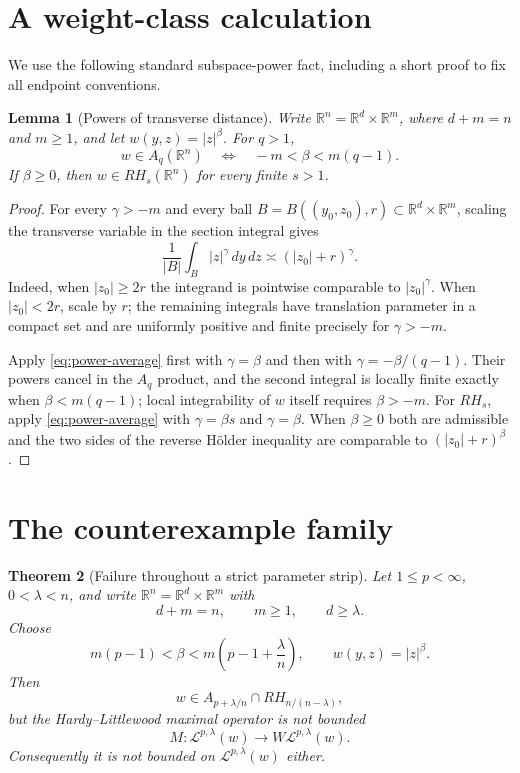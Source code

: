 \documentclass[10pt]{article}
\newtheorem{theorem}{Theorem}
\newtheorem{lemma}[theorem]{Lemma}
\newcommand{\R}{\mathbb R}
\newcommand{\Mor}{\mathcal L}
\newcommand{\WMor}{W\mathcal L}
\begin{document}
\section*{A weight-class calculation}

We use the following standard subspace-power fact, including a short proof to
fix all endpoint conventions.

\begin{lemma}[Powers of transverse distance]\label{lem:weight}
Write $\R^n=\R^d\times\R^m$, where $d+m=n$ and $m\ge1$, and let
\(w(y,z)=|z|^\beta\).  For $q>1$,
\[
 w\in A_q(\R^n)\quad\Longleftrightarrow\quad
 -m<\beta<m(q-1).
\]
If $\beta\ge0$, then $w\in RH_s(\R^n)$ for every finite $s>1$.
\end{lemma}

\begin{proof}
For every $\gamma>-m$ and every ball
$B=B((y_0,z_0),r)\subset\R^d\times\R^m$, scaling the transverse variable
in the section integral gives
\begin{equation}\label{eq:power-average}
 \frac1{|B|}\int_B |z|^\gamma\,dy\,dz
 \asymp (|z_0|+r)^\gamma.
\end{equation}
Indeed, when $|z_0|\ge2r$ the integrand is pointwise comparable to
$|z_0|^\gamma$.  When $|z_0|<2r$, scale by $r$; the remaining integrals have
translation parameter in a compact set and are uniformly positive and
finite precisely for $\gamma>-m$.

Apply \eqref{eq:power-average} first with $\gamma=\beta$ and then with
$\gamma=-\beta/(q-1)$.  Their powers cancel in the $A_q$ product, and the
second integral is locally finite exactly when $\beta<m(q-1)$; local
integrability of $w$ itself requires $\beta>-m$.  For $RH_s$, apply
\eqref{eq:power-average} with $\gamma=\beta s$ and $\gamma=\beta$.
When $\beta\ge0$ both are admissible and the two sides of the reverse
Hölder inequality are comparable to $(|z_0|+r)^\beta$.
\end{proof}

\section*{The counterexample family}

\begin{theorem}[Failure throughout a strict parameter strip]\label{thm:main}
Let $1\le p<\infty$, $0<\lambda<n$, and write
$\R^n=\R^d\times\R^m$ with
\[
 d+m=n,\qquad m\ge1,\qquad d\ge\lambda.
\]
Choose
\begin{equation}\label{eq:beta-range}
 m(p-1)<\beta<m\left(p-1+\frac{\lambda}{n}\right),
 \qquad w(y,z)=|z|^\beta.
\end{equation}
Then
\[
 w\in A_{p+\lambda/n}\cap RH_{n/(n-\lambda)},
\]
but the Hardy--Littlewood maximal operator is not bounded
\[
 M:\Mor^{p,\lambda}(w)\longrightarrow\WMor^{p,\lambda}(w).
\]
Consequently it is not bounded on $\Mor^{p,\lambda}(w)$ either.
\end{theorem}
\end{document}
